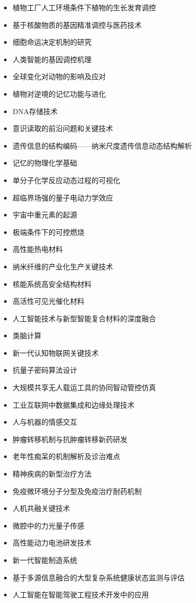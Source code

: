 \documentclass[]{tufte-book}
\begin{document}
\begin{itemize}
\item
  植物工厂人工环境条件下植物的生长发育调控
\item
  基于核酸物质的基因精准调控与医药技术
\item
  细胞命运决定机制的研究
\item
  人类智能的基因调控机理
\item
  全球变化对动物的影响及应对
\item
  植物对逆境的记忆功能与进化
\item
  DNA存储技术
\item
  意识读取的前沿问题和关键技术
\item
  遗传信息的结构编码------纳米尺度遗传信息动态结构解析
\item
  记忆的物理化学基础
\item
  单分子化学反应动态过程的可视化
\item
  超临界场强的量子电动力学效应
\item
  宇宙中重元素的起源
\item
  极端条件下的可控燃烧
\item
  高性能热电材料
\item
  纳米纤维的产业化生产关键技术
\item
  核能系统高安全结构材料
\item
  高活性可见光催化材料
\item
  人工智能技术与新型智能复合材料的深度融合
\item
  类脑计算
\item
  新一代认知物联网关键技术
\item
  抗量子密码算法设计
\item
  大规模共享无人载运工具的协同智动管控仿真
\item
  工业互联网中数据集成和边缘处理技术
\item
  人与机器的情感交互
\item
  肿瘤转移机制与抗肿瘤转移新药研发
\item
  老年性痴呆的机制解析及诊治难点
\item
  精神疾病的新型治疗方法
\item
  免疫微环境分子分型及免疫治疗耐药机制
\item
  人机共融关键技术
\item
  微腔中的力光量子传感
\item
  高性能动力电池研发技术
\item
  新一代智能制造系统
\item
  基于多源信息融合的大型复杂系统健康状态监测与评估
\item
  人工智能在智能驾驶工程技术开发中的应用

\end{itemize}
\end{document}
